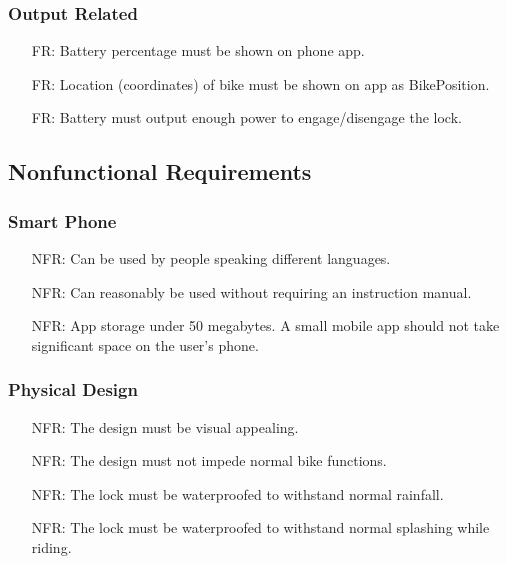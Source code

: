 \documentclass[12pt]{article}
\newcounter{reqnum} %
\newcounter{nfrnum} %
\begin{document}
\subsubsection{Output Related}
\begin{itemize}
\setlength{\itemindent}{.5in}
\item[FR\refstepcounter{reqnum}\thereqnum\label{FR11}:] Battery percentage must be shown on phone app.
\item[FR\refstepcounter{reqnum}\thereqnum\label{FR12}:] Location (coordinates) of bike must be shown on app as BikePosition.
\item[FR\refstepcounter{reqnum}\thereqnum\label{FR13}:] Battery must output enough power to engage/disengage the lock.
\end{itemize}

\subsection{Nonfunctional Requirements}

\subsubsection{Smart Phone}
\begin{itemize}
\setlength{\itemindent}{.5in}
\item[NFR\refstepcounter{nfrnum}\thenfrnum\label{NFR1}:] Can be used by people speaking different languages.
\item[NFR\refstepcounter{nfrnum}\thenfrnum\label{NFR2}:] Can reasonably be used without requiring an instruction manual.
\item[NFR\refstepcounter{nfrnum}\thenfrnum\label{NFR3}:] App storage under 50 megabytes. A small mobile app should not take significant space on the user's phone. 
\end{itemize}

\subsubsection{Physical Design}
\begin{itemize}
\setlength{\itemindent}{.5in}
\item[NFR\refstepcounter{nfrnum}\thenfrnum\label{NFR4}:] The design must be visual appealing.
\item[NFR\refstepcounter{nfrnum}\thenfrnum\label{NFR5}:] The design must not impede normal bike functions.
\item[NFR\refstepcounter{nfrnum}\thenfrnum\label{NFR6}:] The lock must be waterproofed to withstand normal rainfall.
\item[NFR\refstepcounter{nfrnum}\thenfrnum\label{NFR7}:] The lock must be waterproofed to withstand normal splashing while riding.
\end{itemize}
\end{document}
